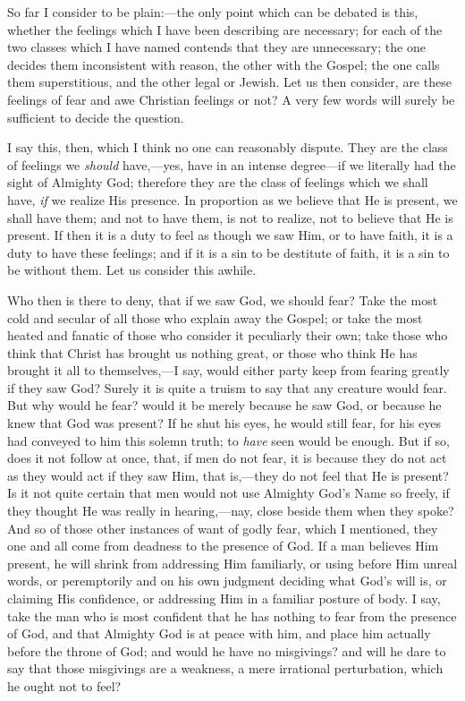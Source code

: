 So far I consider to be plain:—the only point which can be
debated is this, whether the feelings which I have been describing are
necessary; for each of the two classes which I have named contends
that they are unnecessary; the one decides them inconsistent with
reason, the other with the Gospel; the one calls them superstitious,
and the other legal or Jewish. Let us then consider, are these
feelings of fear and awe Christian feelings or not? A very few words
will surely be sufficient to decide the question.

I say this, then, which I think no one can reasonably dispute. They
are the class of feelings we \emph{should} have,—yes, have in an
intense degree—if we literally had the sight of Almighty God;
therefore they are the class of feelings which we shall have, \emph{if}
we realize His presence. In proportion as we believe that He is
present, we shall have them; and not to have them, is not to realize,
not to believe that He is present. If then it is a duty to feel as
though we saw Him, or to have faith, it is a duty to have these
feelings; and if it is a sin to be destitute of faith, it is a sin to
be without them. Let us consider this awhile.

Who then is there to deny, that if we saw God, we should fear? Take
the most cold and secular of all those who explain away the Gospel; or
take the most heated and fanatic of those who consider it peculiarly
their own; take those who think that Christ has brought us nothing
great, or those who think He has brought it all to themselves,—I
say, would either party keep from fearing greatly if they saw God?
Surely it is quite a truism to say that any creature would fear. But
why would he fear? would it be merely because he saw God, or because
he knew that God was present? If he shut his eyes, he would still
fear, for his eyes had conveyed to him this solemn truth; to \emph{have}
seen would be enough. But if so, does it not follow at once, that, if
men do not fear, it is because they do not act as they would act if
they saw Him, that is,—they do not feel that He is present? Is it
not quite certain that men would not use Almighty God's Name so
freely, if they thought He was really in hearing,—nay, close beside
them when they spoke? And so of those other instances of want of godly
fear, which I mentioned, they one and all come from deadness to the
presence of God. If a man believes Him present, he will shrink from
addressing Him familiarly, or using before Him unreal words, or
peremptorily and on his own judgment deciding what God's will is, or
claiming His confidence, or addressing Him in a familiar posture of
body. I say, take the man who is most confident that he has nothing to
fear from the presence of God, and that Almighty God is at peace with
him, and place him actually before the throne of God; and would he
have no misgivings? and will he dare to say that those misgivings are
a weakness, a mere irrational perturbation, which he ought not to
feel?


